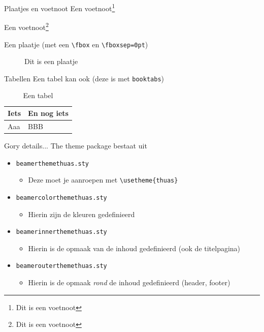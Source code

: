 \documentclass[fleqn,aspectratio=169,dutch]{beamer}
\begin{document}
\begin{frame}[fragile]{Plaatjes en voetnoot}
Een voetnoot\footnote{Dit is een voetnoot}

Een voetnoot\footnote{Dit is een voetnoot}

Een plaatje (met een \lstinline|\fbox| en \lstinline|\fboxsep=0pt|)

\begin{figure}[!ht]
\fboxsep=0pt
\caption{Dit is een plaatje}
\end{figure}

\end{frame}

\begin{frame}{Tabellen}
Een tabel kan ook (deze is met \texttt{booktabs})

\begin{table}[!ht]
\caption{Een tabel}
\begin{tabular}{ll}
\toprule
Iets & En nog iets\\
\midrule
Aaa & BBB\\
\bottomrule
\end{tabular}
\end{table}
\end{frame}

\begin{frame}[fragile]{Gory details...}
The theme package bestaat uit
\begin{itemize}
\item \texttt{beamerthemethuas.sty}
\begin{itemize}
\item Deze moet je aanroepen met \lstinline|\usetheme{thuas}|
\end{itemize}
\item \texttt{beamercolorthemethuas.sty}
\begin{itemize}
\item Hierin zijn de kleuren gedefinieerd
\end{itemize}
\item \texttt{beamerinnerthemethuas.sty}
\begin{itemize}
\item Hierin is de opmaak van de inhoud gedefinieerd (ook de titelpagina)
\end{itemize}
\item \texttt{beamerouterthemethuas.sty}
\begin{itemize}
\item Hierin is de opmaak \emph{rond} de inhoud gedefinieerd (header, footer)
\end{itemize}
\end{itemize}
\end{frame}
\end{document}
